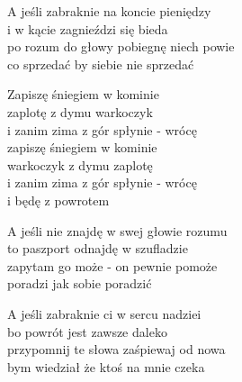 \begin{text}
    A jeśli zabraknie na koncie pieniędzy\\
    i w kącie zagnieździ się bieda\\
    po rozum do głowy pobiegnę niech powie\\
    co sprzedać by siebie nie sprzedać

    Zapiszę śniegiem w kominie\\
    zaplotę z dymu warkoczyk\\
    i zanim zima z gór spłynie - wrócę\\
    zapiszę śniegiem w kominie\\
    warkoczyk z dymu zaplotę\\
    i zanim zima z gór spłynie - wrócę\\
    i będę z powrotem

    A jeśli nie znajdę w swej głowie rozumu\\
    to paszport odnajdę w szufladzie\\
    zapytam go może - on pewnie pomoże\\
    poradzi jak sobie poradzić

    A jeśli zabraknie ci w sercu nadziei\\
    bo powrót jest zawsze daleko\\
    przypomnij te słowa zaśpiewaj od nowa\\
    bym wiedział że ktoś na mnie czeka
\end{text}
\begin{chord}

\end{chord}
